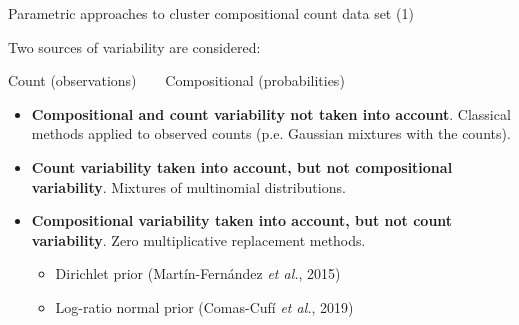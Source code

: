 \documentclass[9pt]{beamer}
\begin{document}
\begin{frame}{Parametric approaches to cluster compositional count data set (1)}

Two sources of variability are considered: 
\begin{center}Count (observations) $\;\;\;\;\;$ Compositional (probabilities)\end{center}

\begin{itemize}
\item \textbf{{\color{red}Compositional} and {\color{red}count} variability not taken into account}. Classical methods applied to observed counts (p.e. Gaussian mixtures with the counts). \vspace{0.3cm}
\item \textbf{{\color{green}Count} variability taken into account, but not {\color{red}compositional} variability}. Mixtures of multinomial distributions.\vspace{0.3cm}
\item \textbf{{\color{green}Compositional} variability taken into account, but not {\color{red}count} variability}. Zero multiplicative replacement methods.
\begin{itemize}
\item Dirichlet prior  (Martín-Fernández \textit{et al.}, 2015)
\item Log-ratio normal  prior (Comas-Cufí \textit{et al.}, 2019)
\end{itemize}
\end{itemize}

\end{frame}
\end{document}
